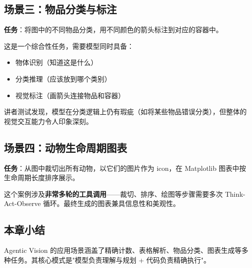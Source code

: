 \subsection{场景三：物品分类与标注}

\textbf{任务}：将图中的不同物品分类，用不同颜色的箭头标注到对应的容器中。

这是一个综合性任务，需要模型同时具备：
\begin{itemize}
    \item 物体识别（知道这是什么）
    \item 分类推理（应该放到哪个类别）
    \item 视觉标注（画箭头连接物品和容器）
\end{itemize}

讲者测试发现，模型在分类逻辑上仍有瑕疵（如将某些物品错误分类），但整体的视觉交互能力令人印象深刻。

\subsection{场景四：动物生命周期图表}

\textbf{任务}：从图中裁切出所有动物，以它们的图片作为 icon，在 Matplotlib 图表中按生命周期长度排序展示。

这个案例涉及\textbf{非常多轮的工具调用}——裁切、排序、绘图等步骤需要多次 Think-Act-Observe 循环。最终生成的图表兼具信息性和美观性。

\subsection{本章小结}

Agentic Vision 的应用场景涵盖了精确计数、表格解析、物品分类、图表生成等多种任务。其核心模式是"模型负责理解与规划 + 代码负责精确执行"。


